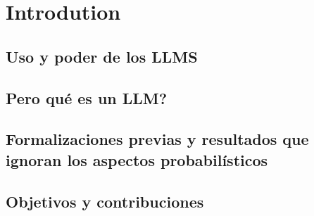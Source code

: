 \chapter{Introdution}

\section{Uso y poder de los LLMS}


\section{Pero qué es un LLM?}


\section{Formalizaciones previas y resultados que ignoran los aspectos probabilísticos}


\section{Objetivos y contribuciones}

